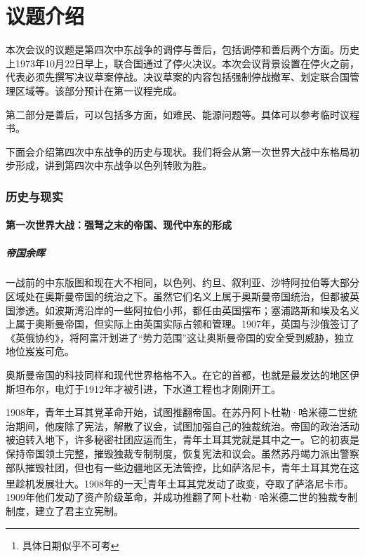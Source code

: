 \documentclass{article}
\begin{document}
\part{议题介绍}
本次会议的议题是第四次中东战争的调停与善后，包括调停和善后两个方面。历史上1973年10月22日早上，联合国通过了停火决议。本次会议背景设置在停火之前，代表必须先撰写决议草案停战。决议草案的内容包括强制停战撤军、划定联合国管理区域等。该部分预计在第一议程完成。

第二部分是善后，可以包括多方面，如难民、能源问题等。具体可以参考临时议程书。

下面会介绍第四次中东战争的历史与现状。我们将会从第一次世界大战中东格局初步形成，讲到第四次中东战争以色列转败为胜。
\section{历史与现实}
\subsection{第一次世界大战：强弩之末的帝国、现代中东的形成}
\subsubsection{帝国余晖}
一战前的中东版图和现在大不相同，以色列、约旦、叙利亚、沙特阿拉伯等大部分区域处在奥斯曼帝国的统治之下。虽然它们名义上属于奥斯曼帝国统治，但都被英国渗透。如波斯湾沿岸的一些阿拉伯小邦，都任由英国摆布；塞浦路斯和埃及名义上属于奥斯曼帝国，但实际上由英国实际占领和管理。1907年，英国与沙俄签订了《英俄协约》，将阿富汗划进了“势力范围”这让奥斯曼帝国的安全受到威胁，独立地位岌岌可危。

奥斯曼帝国的科技同样和现代世界格格不入。在它的首都，也就是最发达的地区伊斯坦布尔，电灯于1912年才被引进，下水道工程也才刚刚开工。

1908年，青年土耳其党革命开始，试图推翻帝国。在苏丹阿卜杜勒·哈米德二世统治期间，他废除了宪法，解散了议会，试图加强自己的独裁统治。帝国的政治活动被迫转入地下，许多秘密社团应运而生，青年土耳其党就是其中之一。它的初衷是保持帝国领土完整，摧毁独裁专制制度，恢复宪法和议会。虽然苏丹竭力派出警察部队摧毁社团，但也有一些边疆地区无法管控，比如萨洛尼卡，青年土耳其党在这里趁机发展壮大。1908年的一天\footnote{具体日期似乎不可考}青年土耳其党发动了政变，夺取了萨洛尼卡市。1909年他们发动了资产阶级革命，并成功推翻了阿卜杜勒·哈米德二世的独裁专制制度，建立了君主立宪制。
\end{document}
